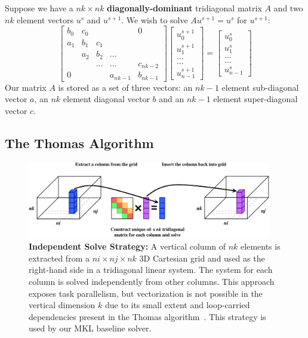 \documentclass[10pt, conference, compsocconf]{IEEEtran}
\begin{document}
Suppose we have a \(nk \times nk\) \textbf{diagonally-dominant} tridiagonal
  matrix \(A\) and two \(nk\) element vectors \(u^{s}\) and \(u^{s+1}\). 
  We wish to solve \(Au^{s+1} = u^{s}\) for \(u^{s+1}\):
\[
\begin{bmatrix}
b_0 & c_0 &     &          & 0        \\
a_1 & b_1 & c_1 &          &          \\
    & a_2 & b_2 & ...      &          \\
    &     & ... & ...      & c_{nk-2} \\
0   &     &     & a_{nk-1} & b_{nk-1}
\end{bmatrix}
\begin{bmatrix}
u^{s+1}_0     \\
u^{s+1}_1     \\
...     \\
...     \\
u^{s+1}_{n-1}
\end{bmatrix}
=
\begin{bmatrix}
u^{s}_0     \\
u^{s}_1     \\
...     \\
...     \\
u^{s}_{n-1}
\end{bmatrix}
\]
Our matrix \(A\) is stored as a set of three vectors: an \(nk-1\) element
  sub-diagonal vector \(a\), an \(nk\) element diagonal vector \(b\) and an
  \(nk-1\) element super-diagonal vector \(c\).

\subsection{The Thomas Algorithm}
\label{sec:impl:thomas_algorithm}

\begin{figure}[!bth]
  \centering
  \caption{\small
      \textbf{Independent Solve Strategy:} A vertical column of \(nk\) elements is
      extracted from a \(ni \times nj \times nk\) 3D Cartesian grid and used as
      the right-hand side in a tridiagonal linear system.
    The system for each column is solved independently from other columns.
    This approach exposes task parallelism, but vectorization is not possible
      in the vertical dimension \(k\) due to its small extent and loop-carried
      dependencies present in the Thomas
      algorithm~\cite{pipelined_thomas_algorithm}.
    This strategy is used by our MKL baseline solver.
  }
  \label{fig:impl:batching:ind_strat}
  \includegraphics[width=0.95\textwidth]{figures/batching/independent_solve_diagram.pdf}
\end{figure}
\end{document}
